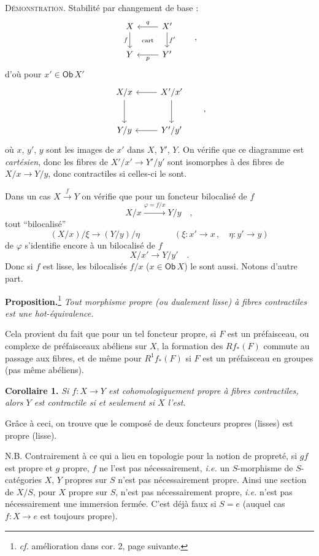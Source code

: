 \documentclass[11pt]{article}
\newcommand{\printedpage}[1]{\marginpar{\footnotesize p.~#1}}
\newcommand{\msp}[1]{\marginpar{\footnotesize [#1]}}
\newcommand{\Ob}{\mathsf{Ob}}
\begin{document}
\printedpage{31}

\noindent\msp{page 55}
\textsc{Démonstration}. Stabilité par changement de base :
\[
\begin{tikzcd}
X \arrow[d, "f"'] \arrow[dr, phantom, "\text{\scriptsize cart}"] & X' \arrow[l, "q"'] \arrow[d, "f'"] \\
Y & Y' \arrow[l, "p"]
\end{tikzcd}
\qquad ,
\]
d'où pour $x' \in \Ob\, X'$
\[
\begin{tikzcd}[row sep=large]
X/x \arrow[d] & X'/x' \arrow[l] \arrow[d] \\
Y/y & Y'/y' \arrow[l]
\end{tikzcd}
\qquad ,
\]
où $x$, $y'$, $y$ sont les images de $x'$ dans $X$, $Y'$, $Y$. On vérifie que ce diagramme est \textit{cartésien}, donc les fibres de $X'/x' \longrightarrow Y'/y'$ sont isomorphes à des fibres de $X/x \longrightarrow Y/y$, donc contractiles si celles-ci le sont.

Dans un cas $X \xrightarrow{f} Y$ on vérifie que pour un foncteur bilocalisé de $f$
\[
X/x \xrightarrow{\varphi=f/x} Y/y \quad ,
\]
tout ``bilocalisé''
\[
(X/x)/\xi \longrightarrow (Y/y)/\eta \qquad\qquad (\xi : x' \to x\,, \quad \eta : y' \to y)
\]
de $\varphi$ s'identifie encore à un bilocalisé de $f$
\[
X/x' \longrightarrow Y/y' \quad .
\]
Donc si $f$ est lisse, les bilocalisés $f/x$ ($x \in \Ob\, X$) le sont aussi. Notons d'autre part.

\noindent\textbf{Proposition.}\footnote[24]{\textit{cf.} amélioration dans cor. 2, page suivante.} \textit{Tout morphisme propre (ou dualement lisse) à fibres contractiles est une hot-équivalence.}

\noindent\msp{page 56}
Cela provient du fait que pour un tel foncteur propre, si $F$ est un préfaisceau, ou complexe de préfaisceaux abéliens sur $X$, la formation des $Rf_*(F)$ commute au passage aux fibres, et de même pour $R^1f_*(F)$ si $F$ est un préfaisceau en groupes (pas même abéliens).

\noindent\textbf{Corollaire 1.} \textit{Si $f : X \to Y$ est cohomologiquement propre à fibres contractiles, alors $Y$ est contractile si et seulement si $X$ l'est.}

Grâce à ceci, on trouve que le composé de deux foncteurs propres (lisses) est propre (lisse).

\printedpage{32}

\noindent N.B. Contrairement à ce qui a lieu en topologie pour la notion de propreté, si $gf$ est propre et $g$ propre, $f$ ne l'est pas nécessairement, \textit{i.e.} un $S$-morphisme de $S$-catégories $X$, $Y$ propres sur $S$ n'est pas nécessairement propre. Ainsi une section de $X/S$, pour $X$ propre sur $S$, n'est pas nécessairement propre, \textit{i.e.} n'est pas nécessairement une immersion fermée. C'est déjà faux si $S = e$ (auquel cas $f : X \to e$ est toujours propre).
\end{document}
